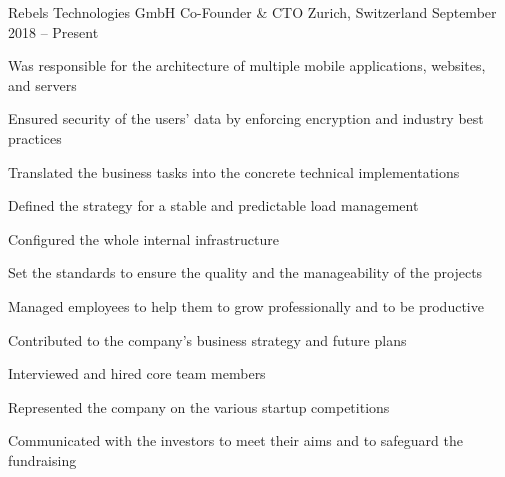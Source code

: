 \begin{cventries}
	\cventry
		{Rebels Technologies GmbH}
		{Co-Founder \& CTO}
		{Zurich, Switzerland}
		{September 2018 -- Present}
		{
			\begin{cvitems}
				\item {Was responsible for the architecture of multiple mobile applications, websites, and servers}
				\item {Ensured security of the users' data by enforcing encryption and industry best practices}
				\item {Translated the business tasks into the concrete technical implementations}
				\item {Defined the strategy for a stable and predictable load management}
				\item {Configured the whole internal infrastructure}
				\item {Set the standards to ensure the quality and the manageability of the projects}
				\item {Managed employees to help them to grow professionally and to be productive}
				\item {Contributed to the company's business strategy and future plans}
				\item {Interviewed and hired core team members}
				\item {Represented the company on the various startup competitions}
				\item {Communicated with the investors to meet their aims and to safeguard the fundraising}
			\end{cvitems}
		}
\end{cventries}

